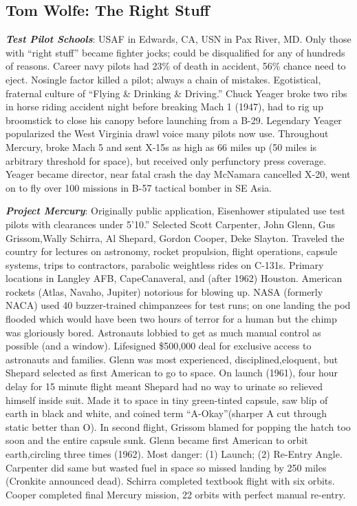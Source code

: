 \documentclass[
]{article}
\begin{document}
\hypertarget{tom-wolfe-the-right-stuff}{%
\subsection{Tom Wolfe: The Right
Stuff}\label{tom-wolfe-the-right-stuff}}

\textbf{\emph{Test Pilot Schools}}: USAF in Edwards, CA, USN in Pax
River, MD. Only those with ``right stuff'' became fighter jocks; could
be disqualified for any of hundreds of reasons. Career navy pilots had
23\% of death in accident, 56\% chance need to eject. Nosingle factor
killed a pilot; always a chain of mistakes. Egotistical, fraternal
culture of ``Flying \& Drinking \& Driving.'' Chuck Yeager broke two
ribs in horse riding accident night before breaking Mach 1 (1947), had
to rig up broomstick to close his canopy before launching from a B-29.
Legendary Yeager popularized the West Virginia drawl voice many pilots
now use. Throughout Mercury, broke Mach 5 and sent X-15s as high as 66
miles up (50 miles is arbitrary threshold for space), but received only
perfunctory press coverage. Yeager became director, near fatal crash the
day McNamara cancelled X-20, went on to fly over 100 missions in B-57
tactical bomber in SE Asia.

\textbf{\emph{Project Mercury}}: Originally public application,
Eisenhower stipulated use test pilots with clearances under 5'10.''
Selected Scott Carpenter, John Glenn, Gus Grissom,Wally Schirra, Al
Shepard, Gordon Cooper, Deke Slayton. Traveled the country for lectures
on astronomy, rocket propulsion, flight operations, capsule systems,
trips to contractors, parabolic weightless rides on C-131s. Primary
locations in Langley AFB, CapeCanaveral, and (after 1962) Houston.
American rockets (Atlas, Navaho, Jupiter) notorious for blowing up. NASA
(formerly NACA) used 40 buzzer-trained chimpanzees for test runs; on one
landing the pod flooded which would have been two hours of terror for a
human but the chimp was gloriously bored. Astronauts lobbied to get as
much manual control as possible (and a window). Lifesigned \$500,000
deal for exclusive access to astronauts and families. Glenn was most
experienced, disciplined,eloquent, but Shepard selected as first
American to go to space. On launch (1961), four hour delay for 15 minute
flight meant Shepard had no way to urinate so relieved himself inside
suit. Made it to space in tiny green-tinted capsule, saw blip of earth
in black and white, and coined term ``A-Okay''(sharper A cut through
static better than O). In second flight, Grissom blamed for popping the
hatch too soon and the entire capsule sunk. Glenn became first American
to orbit earth,circling three times (1962). Most danger: (1) Launch; (2)
Re-Entry Angle. Carpenter did same but wasted fuel in space so missed
landing by 250 miles (Cronkite announced dead). Schirra completed
textbook flight with six orbits. Cooper completed final Mercury mission,
22 orbits with perfect manual re-entry.
\end{document}
